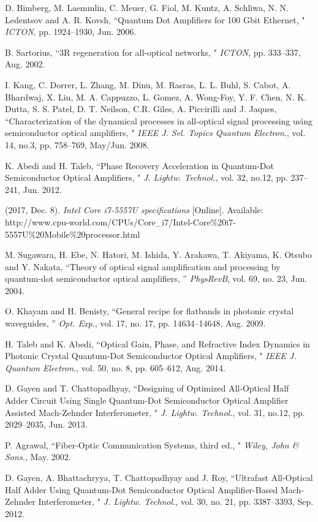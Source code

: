 \documentclass[twocolumn]{el-author}
\begin{document}
\begin{thebibliography}{9}
D. Bimberg, M. Laemmlin, C. Meuer, G. Fiol, M. Kuntz, A. Schliwa, N. N. Ledentsov and A. R. Kovsh, ``Quantum Dot Amplifiers for 100 Gbit Ethernet, " {\it ICTON}, pp. 1924--1930, Jun. 2006.

B. Sartorius, ``3R regeneration for all-optical networks, " {\it ICTON}, pp. 333--337, Aug. 2002.

I. Kang, C. Dorrer, L. Zhang, M. Dinu, M. Rasras, L. L. Buhl, S. Cabot, A. Bhardwaj, X. Liu, M. A. Cappuzzo, L. Gomez, A. Wong-Foy, Y. F. Chen, N. K. Dutta, S. S. Patel, D. T. Neilson, C.R. Giles, A. Piccirilli and J. Jaques, ``Characterization of the dynamical processes in all-optical signal processing using semiconductor optical amplifiers, " {\it IEEE J. Sel. Topics Quantum Electron.}, vol. 14, no.3, pp. 758--769, May/Jun. 2008.

K. Abedi and H. Taleb, ``Phase Recovery Acceleration in Quantum-Dot Semiconductor Optical Amplifiers, " {\it J. Lightw. Technol.}, vol. 32, no.12, pp. 237--241, Jun. 2012.

(2017, Dec. 8). {\it Intel Core i7-5557U specifications} [Online]. Available: http://www.cpu-world.com/CPUs/Core\_i7/Intel-Core\%20i7-5557U\%20Mobile\%20processor.html

M. Sugawara, H. Ebe, N. Hatori, M. Ishida, Y. Arakawa, T. Akiyama, K. Otsubo and Y. Nakata, ``Theory of optical signal amplification and processing by quantum-dot semiconductor optical amplifiers, '' {\it PhysRevB}, vol. 69, no. 23, Jun. 2004.

O. Khayam and H. Benisty, ``General recipe for flatbands in photonic crystal waveguides, '' {\it Opt. Exp.}, vol. 17, no. 17, pp. 14634--14648, Aug. 2009.

H. Taleb and K. Abedi, ``Optical Gain, Phase, and Refractive Index Dynamics in Photonic Crystal Quantum-Dot Semiconductor Optical Amplifiers, " {\it IEEE J. Quantum Electron.}, vol. 50, no. 8, pp. 605--612, Aug. 2014.

D. Gayen and T. Chattopadhyay, ``Designing of Optimized All-Optical Half Adder Circuit Using Single Quantum-Dot Semiconductor Optical Amplifier Assisted Mach-Zehnder Interferometer, " {\it J. Lightw. Technol.}, vol. 31, no.12, pp. 2029--2035, Jun. 2013.

P. Agrawal, ``Fiber-Optic Communication Systems, third ed., " {\it Wiley, John \& Sons.}, May. 2002.

D. Gayen, A. Bhattachryya, T. Chattopadhyay and J. Roy, ``Ultrafast All-Optical Half Adder Using Quantum-Dot Semiconductor Optical Amplifier-Based Mach-Zehnder Interferometer, " {\it J. Lightw. Technol.}, vol. 30, no. 21, pp. 3387--3393, Sep. 2012.

\end{thebibliography}
\end{document}
